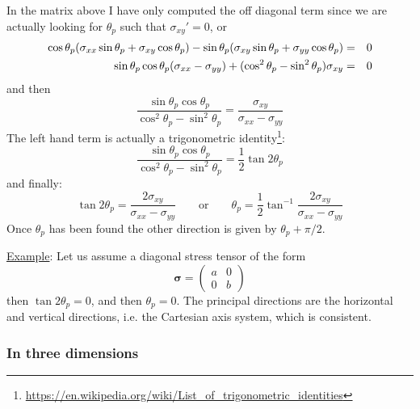 In the matrix above I have only computed the off diagonal term since 
we are actually looking for $\theta_p$ such that $\sigma_{xy}'=0$, or
\begin{eqnarray}
\cos\theta_p(\sigma_{xx} \sin\theta_p + \sigma_{xy} \cos\theta_p )-
\sin\theta_p(\sigma_{xy} \sin\theta_p + \sigma_{yy} \cos\theta_p ) &=& 0 \nonumber\\
\sin\theta_p \cos\theta_p (\sigma_{xx}-\sigma_{yy}) + ( \cos^2\theta_p -\sin^2\theta_p )\sigma_{xy} &=& 0 \nonumber 
\end{eqnarray}
and then 
\[
\frac{ \sin\theta_p \cos\theta_p}{ \cos^2\theta_p -\sin^2\theta_p }
= \frac{\sigma_{xy}}{ \sigma_{xx}-\sigma_{yy} }
\]
The left hand term is actually a trigonometric 
identity\footnote{\url{https://en.wikipedia.org/wiki/List_of_trigonometric_identities}}:
\[
\frac{ \sin\theta_p \cos\theta_p}{ \cos^2\theta_p -\sin^2\theta_p } = \frac{1}{2} \tan 2\theta_p
\]
and finally:
\[
\tan 2\theta_p = \frac{ 2\sigma_{xy}}{ \sigma_{xx}-\sigma_{yy} }
\qquad
\text{or}
\qquad
\boxed{
\theta_p = \frac{1}{2} \tan^{-1} \frac{ 2\sigma_{xy}}{ \sigma_{xx}-\sigma_{yy} }
}
\]
Once $\theta_p$ has been found the other direction is given by $\theta_p +\pi/2$.

\vspace{.5cm}

\noindent \underline{Example}: Let us assume a diagonal stress tensor of the form 
\[
{\bm \sigma} = 
\left(
\begin{array}{cc}
a & 0 \\
0 & b
\end{array}
\right)
\]
then $\tan 2\theta_p = 0$, and then $\theta_p=0$. The principal directions are the horizontal and 
vertical directions, i.e. the Cartesian axis system, which is consistent.




\subsubsection{In three dimensions}

